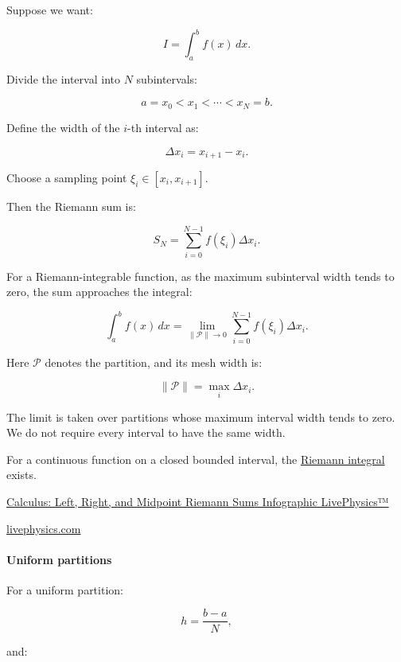 Suppose we want:

\[
I=\int_a^b f(x)\,dx.
\]

Divide the interval into \(N\) subintervals:

\[
a=x_0<x_1<\cdots<x_N=b.
\]

Define the width of the \(i\)-th interval as:

\[
\Delta x_i=x_{i+1}-x_i.
\]

Choose a sampling point \(\xi_i\in[x_i,x_{i+1}]\).

Then the Riemann sum is:

\[
S_N=\sum_{i=0}^{N-1}f(\xi_i)\Delta x_i.
\]

For a Riemann-integrable function, as the maximum subinterval width tends to zero, the sum approaches the integral:

\[
\boxed{ \int_a^b f(x)\,dx = \lim_{\|\mathcal P\|\to0} \sum_{i=0}^{N-1}f(\xi_i)\Delta x_i }.
\]

Here \(\mathcal P\) denotes the partition, and its mesh width is:

\[
\|\mathcal P\|=\max_i\Delta x_i.
\]

The limit is taken over partitions whose maximum interval width tends to zero. We do not require every interval to have the same width.

For a continuous function on a closed bounded interval, the \hyperref[02-foundations-ii-ch022-integration-and-quadrature]{Riemann integral} exists.

\href{https://images.openai.com/static-rsc-4/t5MkAz-2qFGici8ndHfZur9gQtfdWJYL32F6n8G88ZHPGmAsnDRse5qe5xfYJJ4GJcZqh8uYwSaYHOu9cPkLr8aB6FomkHL4VOpXoOryLK4Ee1f_NR5LPcOGaSAMPsLd58tQ6P4H7c9PoHrfy0mY3unWO2wadUnb798uxKmCL0Y?purpose=inline}{Calculus: Left, Right, and Midpoint Riemann Sums Infographic \textbar{} LivePhysics™}

\href{https://livephysics.com/infographics/calculus-left-right-and-midpoint-riemann-sums/?utm_source=chatgpt.com}{livephysics.com}

\paragraph{Uniform partitions}\label{02-foundations-ii-ch022-uniform-partitions}

\hypertarget{02-foundations-ii-ch022-uniform-partitions}{}

For a uniform partition:

\[
h=\frac{b-a}{N},
\]

and:

